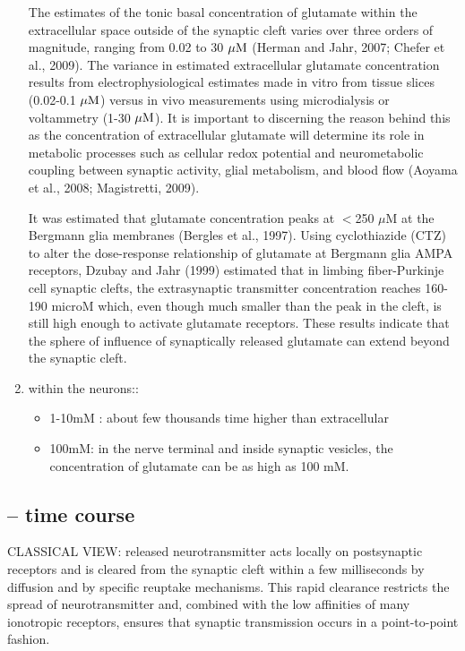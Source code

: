 \begin{enumerate}
The estimates of the tonic basal concentration of glutamate within the
extracellular space outside of the synaptic cleft varies over three orders of
magnitude, ranging from 0.02 to 30 ${\mu\text{M}}$ (Herman and Jahr, 2007; Chefer et al.,
2009). The variance in estimated extracellular glutamate concentration results
from electrophysiological estimates made in vitro from tissue slices
(0.02-0.1 ${\mu\text{M}}$) versus in vivo measurements using microdialysis or voltammetry
(1-30 ${\mu\text{M}}$). It is important to discerning the reason behind this
as the concentration of extracellular glutamate will determine its role in
metabolic processes such as cellular redox potential and neurometabolic
coupling between synaptic activity, glial metabolism, and blood flow (Aoyama et
al., 2008; Magistretti, 2009).

It was estimated that glutamate concentration peaks at $<$250 $\mu$M at the
Bergmann glia membranes (Bergles et al., 1997). Using cyclothiazide (CTZ) to
alter the dose-response relationship of glutamate at Bergmann glia AMPA
receptors, Dzubay and Jahr (1999) estimated that in limbing fiber-Purkinje cell
synaptic clefts, the extrasynaptic transmitter concentration reaches 160-190
microM which, even though much smaller than the peak in the cleft, is still high
enough to activate glutamate receptors. These results indicate that the sphere
of influence of synaptically released glutamate can extend beyond the synaptic cleft.
  
  \item within the neurons::
  \begin{itemize}
    \item 1-10mM : about few thousands time higher than extracellular
    \item 100mM: in the nerve terminal and inside synaptic vesicles, the
    concentration of glutamate can be as high as 100 mM. 
  \end{itemize}
  
\end{enumerate}


\subsection{-- time course}
\label{sec:Glutamate-time-course}
 
CLASSICAL VIEW: released neurotransmitter acts locally on postsynaptic receptors
and is cleared from the synaptic cleft within a few milliseconds by diffusion
and by specific reuptake mechanisms. This rapid clearance restricts the spread
of neurotransmitter and, combined with the low affinities of many ionotropic
receptors, ensures that synaptic transmission occurs in a point-to-point
fashion.

